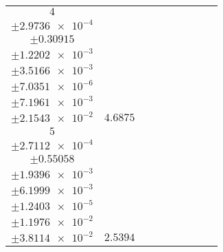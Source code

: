 \documentclass[8pt]{article}
\begin{document}
\begin{longtable}[l]{c c c c c c c c c}
$\num{4}$ & \begin{tabular}[c]{@{}c@{}}$\num{5.7478e-2}$ \\ $\pm\num{2.9736e-4}$\end{tabular} & \begin{tabular}[c]{@{}c@{}}$\num{-0.37382}$ \\ $\pm\num{0.30915}$\end{tabular} & \begin{tabular}[c]{@{}c@{}}$\num{0.49663}$ \\ $\pm\num{1.2202e-3}$\end{tabular} & \begin{tabular}[c]{@{}c@{}}$\num{3.5482e+3}$ \\ $\pm\num{3.5166e-3}$\end{tabular} & \begin{tabular}[c]{@{}c@{}}$\num{7.0984}$ \\ $\pm\num{7.0351e-6}$\end{tabular} & \begin{tabular}[c]{@{}c@{}}$\num{1.3109}$ \\ $\pm\num{7.1961e-3}$\end{tabular} & \begin{tabular}[c]{@{}c@{}}$\num{4.2967}$ \\ $\pm\num{2.1543e-2}$\end{tabular} & $\num{4.6875}$\\
$\num{5}$ & \begin{tabular}[c]{@{}c@{}}$\num{2.9565e-2}$ \\ $\pm\num{2.7112e-4}$\end{tabular} & \begin{tabular}[c]{@{}c@{}}$\num{1.6459}$ \\ $\pm\num{0.55058}$\end{tabular} & \begin{tabular}[c]{@{}c@{}}$\num{6.9252}$ \\ $\pm\num{1.9396e-3}$\end{tabular} & \begin{tabular}[c]{@{}c@{}}$\num{3.5546e+3}$ \\ $\pm\num{6.1999e-3}$\end{tabular} & \begin{tabular}[c]{@{}c@{}}$\num{7.1112}$ \\ $\pm\num{1.2403e-5}$\end{tabular} & \begin{tabular}[c]{@{}c@{}}$\num{1.1676}$ \\ $\pm\num{1.1976e-2}$\end{tabular} & \begin{tabular}[c]{@{}c@{}}$\num{4.196}$ \\ $\pm\num{3.8114e-2}$\end{tabular} & $\num{2.5394}$\\

\end{longtable}
\end{document}
